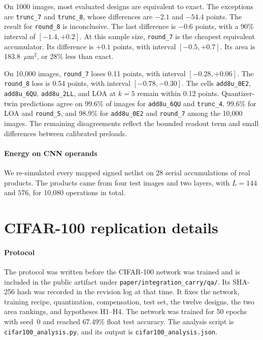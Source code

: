 \documentclass[11pt]{article}
\begin{document}
On 1000 images, most evaluated designs are equivalent to exact.
The exceptions are \texttt{trunc\_7} and \texttt{trunc\_8}, whose
differences are $-2.1$ and $-54.4$ points. The result for
\texttt{round\_8} is inconclusive. The
last difference is $-0.6$ points, with a 90\% interval of $[-1.4,+0.2]$.
At this sample size, \texttt{round\_7} is the cheapest equivalent
accumulator. Its difference is $+0.1$ points, with interval
$[-0.5,+0.7]$. Its area is 183.8~$\mu$m$^2$, or 28\% less than exact.

On 10{,}000 images, \texttt{round\_7} loses 0.11 points, with interval
$[-0.28,+0.06]$. The \texttt{round\_8} loss is 0.54 points, with
interval $[-0.78,-0.30]$. The cells
\texttt{add8u\_0E2}, \texttt{add8u\_6QU}, \texttt{add8u\_2LL}, and LOA at
$k=5$ remain within 0.12 points. Quantizer-twin predictions agree on 99.6\%
of images for \texttt{add8u\_6QU} and \texttt{trunc\_4}, 99.6\% for LOA and
\texttt{round\_5}, and 98.9\% for \texttt{add8u\_0E2} and
\texttt{round\_7} among the 10{,}000 images. The remaining
disagreements reflect the bounded readout term and small differences
between calibrated preloads.

\paragraph{Energy on CNN operands}
We re-simulated every mapped signed netlist on 28 serial accumulations of
real products. The products came from four test images and two layers, with
$L=144$ and $576$, for 10{,}080 operations in total.

\section{CIFAR-100 replication details}

\paragraph{Protocol}
The protocol was written before the CIFAR-100 network was trained and is
included in the public artifact under \texttt{paper/integration\_carry/qa/}. Its SHA-256 hash was
recorded in the revision log at that time. It fixes the network, training
recipe, quantization, compensation, test set, the twelve designs, the two
area rankings, and hypotheses H1--H4. The network was trained for 50
epochs with seed~0 and reached 67.49\% float test accuracy. The analysis
script is \texttt{cifar100\_analysis.py}, and its output is
\texttt{cifar100\_analysis.json}.
\end{document}
